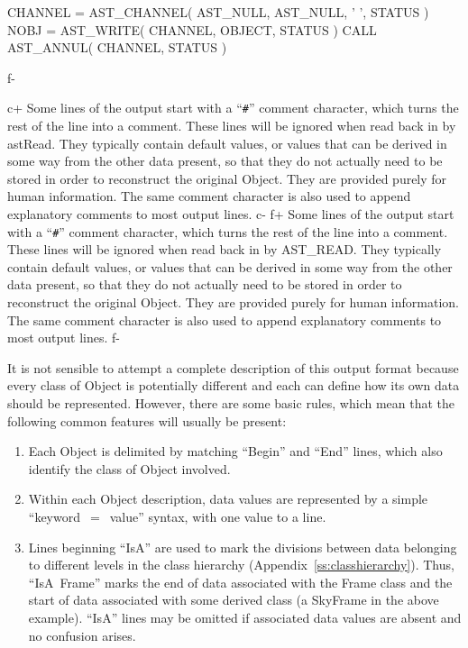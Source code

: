 \documentclass[twoside,11pt]{starlink}
\providecommand{\appref}[1]{Appendix~\ref{#1}}
\begin{document}
{\small
\begin{terminalv}
      CHANNEL = AST_CHANNEL( AST_NULL, AST_NULL, ' ', STATUS )
      NOBJ = AST_WRITE( CHANNEL, OBJECT, STATUS )
      CALL AST_ANNUL( CHANNEL, STATUS )
\end{terminalv}
\normalsize
f-

c+
Some lines of the output start with a ``\verb?#?'' comment character,
which turns the rest of the line into a comment. These lines will be
ignored when read back in by astRead.  They typically contain default
values, or values that can be derived in some way from the other data
present, so that they do not actually need to be stored in order to
reconstruct the original Object. They are provided purely for human
information. The same comment character is also used to append
explanatory comments to most output lines.
c-
f+
Some lines of the output start with a ``\verb?#?'' comment character,
which turns the rest of the line into a comment. These lines will be
ignored when read back in by AST\_READ.  They typically contain
default values, or values that can be derived in some way from the
other data present, so that they do not actually need to be stored in
order to reconstruct the original Object. They are provided purely for
human information. The same comment character is also used to append
explanatory comments to most output lines.
f-

It is not sensible to attempt a complete description of this output
format because every class of Object is potentially different and each
can define how its own data should be represented. However, there are
some basic rules, which mean that the following common features will
usually be present:

\begin{enumerate}
\item Each Object is delimited by matching ``Begin'' and ``End''
lines, which also identify the class of Object involved.

\item Within each Object description, data values are represented
by a simple ``keyword~$=$~value'' syntax, with one value to a line.

\item Lines beginning ``IsA'' are used to mark the divisions between
data belonging to different levels in the class hierarchy
(\appref{ss:classhierarchy}). Thus, ``IsA~Frame'' marks the end of data
associated with the Frame class and the start of data associated with
some derived class (a SkyFrame in the above example). ``IsA'' lines
may be omitted if associated data values are absent and no confusion
arises.


\end{enumerate}}
\end{document}
